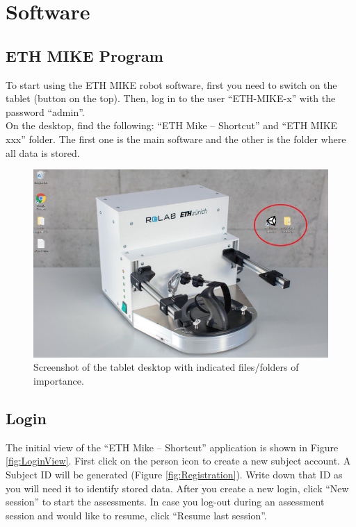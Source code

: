 \documentclass[10pt,oneside,a4paper]{article}
\begin{document}
\newpage
\section{Software}
\subsection{ETH MIKE Program}
To start using the ETH MIKE robot software, first you need to switch on the tablet (button on the top). Then, log in to the user “ETH-MIKE-x” with the password “admin”. \\

On the desktop, find the following: “ETH Mike – Shortcut” and “ETH MIKE xxx” folder. The first one is the main software and the other is the folder where all data is stored. 

\begin{figure}[h!]
\begin{center}
\includegraphics[width=\columnwidth]{images/Hardware/Desktop.png}
\caption{Screenshot of the tablet desktop with indicated files/folders of importance.}
\label{fig:desktop}
\end{center}
\end{figure}

\subsection{Login}
The initial view of the “ETH Mike – Shortcut” application is shown in Figure \ref{fig:LoginView}. First click on the person icon to create a new subject account. A Subject ID will be generated (Figure \ref{fig:Registration}). Write down that ID as you will need it to identify stored data. After you create a new login, click “New session” to start the assessments. In case you log-out during an assessment session and would like to resume, click “Resume last session”. 
\end{document}
